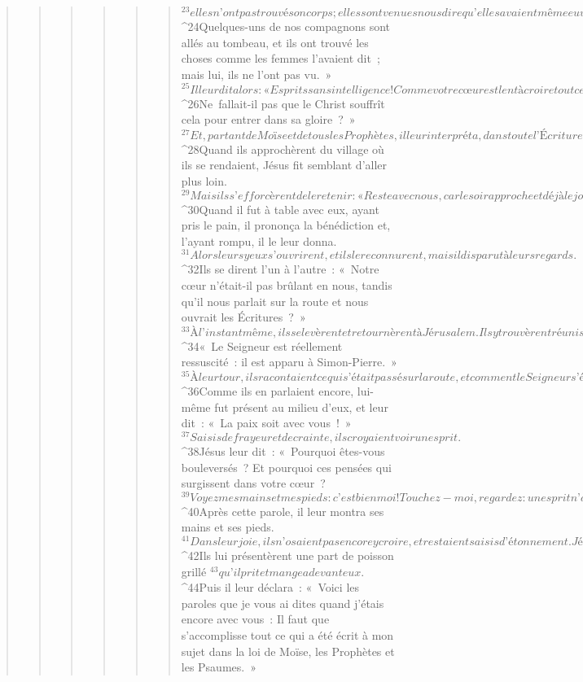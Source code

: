 \begin{verse}
\begin{verse}
\begin{verse}
\begin{verse}
\begin{verse}
\begin{verse}
${}^{23}elles n’ont pas trouvé son corps ; elles sont venues nous dire qu’elles avaient même eu une vision : des anges, qui disaient qu’il est vivant. 
${}^{24}Quelques-uns de nos compagnons sont allés au tombeau, et ils ont trouvé les choses comme les femmes l’avaient dit ; mais lui, ils ne l’ont pas vu. » 
${}^{25}Il leur dit alors : « Esprits sans intelligence ! Comme votre cœur est lent à croire tout ce que les prophètes ont dit ! 
${}^{26}Ne fallait-il pas que le Christ souffrît cela pour entrer dans sa gloire ? » 
${}^{27}Et, partant de Moïse et de tous les Prophètes, il leur interpréta, dans toute l’Écriture, ce qui le concernait.
${}^{28}Quand ils approchèrent du village où ils se rendaient, Jésus fit semblant d’aller plus loin. 
${}^{29}Mais ils s’efforcèrent de le retenir : « Reste avec nous, car le soir approche et déjà le jour baisse. » Il entra donc pour rester avec eux. 
${}^{30}Quand il fut à table avec eux, ayant pris le pain, il prononça la bénédiction et, l’ayant rompu, il le leur donna. 
${}^{31}Alors leurs yeux s’ouvrirent, et ils le reconnurent, mais il disparut à leurs regards. 
${}^{32}Ils se dirent l’un à l’autre : « Notre cœur n’était-il pas brûlant en nous, tandis qu’il nous parlait sur la route et nous ouvrait les Écritures ? »
${}^{33}À l’instant même, ils se levèrent et retournèrent à Jérusalem. Ils y trouvèrent réunis les onze Apôtres et leurs compagnons, qui leur dirent : 
${}^{34}« Le Seigneur est réellement ressuscité : il est apparu à Simon-Pierre. » 
${}^{35}À leur tour, ils racontaient ce qui s’était passé sur la route, et comment le Seigneur s’était fait reconnaître par eux à la fraction du pain.
${}^{36}Comme ils en parlaient encore, lui-même fut présent au milieu d’eux, et leur dit : « La paix soit avec vous ! » 
${}^{37}Saisis de frayeur et de crainte, ils croyaient voir un esprit. 
${}^{38}Jésus leur dit : « Pourquoi êtes-vous bouleversés ? Et pourquoi ces pensées qui surgissent dans votre cœur ? 
${}^{39}Voyez mes mains et mes pieds : c’est bien moi ! Touchez-moi, regardez : un esprit n’a pas de chair ni d’os comme vous constatez que j’en ai. » 
${}^{40}Après cette parole, il leur montra ses mains et ses pieds. 
${}^{41}Dans leur joie, ils n’osaient pas encore y croire, et restaient saisis d’étonnement. Jésus leur dit : « Avez-vous ici quelque chose à manger ? » 
${}^{42}Ils lui présentèrent une part de poisson grillé 
${}^{43}qu’il prit et mangea devant eux.
${}^{44}Puis il leur déclara : « Voici les paroles que je vous ai dites quand j’étais encore avec vous : Il faut que s’accomplisse tout ce qui a été écrit à mon sujet dans la loi de Moïse, les Prophètes et les Psaumes. » 

\end{verse}
\end{verse}
\end{verse}
\end{verse}
\end{verse}
\end{verse}
